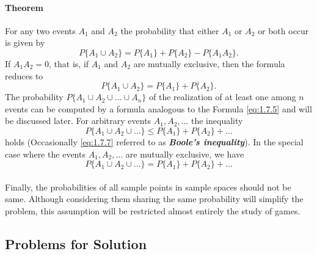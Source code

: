 \documentclass{article}
\numberwithin{equation}{subsection}
\begin{document}
			\paragraph{Theorem} For any two events $A_1$ and $A_2$ the probability that either $A_1$ or $A_2$ or both occur is given by 
			\begin{equation}
				\label{eq:1.7.5}
				P\{A_1\cup A_2\} = P\{A_1\}+P\{A_2\}-P\{A_1A_2\}. 
			\end{equation}
			If $A_1A_2 = 0$, that is, if $A_1$ and $A_2$ are mutually exclusive, then the formula reduces to 			
			\begin{equation}
				\label{eq:1.7.6}
				P\{A_1\cup A_2\} = P\{A_1\}+P\{A_2\}.
			\end{equation}			
			The probability $P\{A_1\cup A_2\cup \dots \cup A_n\}$ of the realization of at least one among $n$ events can be computed by a formula analogous to the Formula \eqref{eq:1.7.5} and will be discussed later. For arbitrary events $A_1,A_2,\dots$ the inequality
			\begin{equation}
				\label{eq:1.7.7}
				P\{A_1\cup A_2\cup \dots\} \leq P\{A_1\} + P\{A_2\} + \dots
			\end{equation}
			holds (Occasionally \eqref{eq:1.7.7} referred to as \textit{\textbf{Boole's inequality}}). In the special case where the events $A_1,A_2,\dots$ are mutually exclusive, we have 
			\begin{equation}
				\label{eq:1.7.8}
				P\{A_1\cup A_2\cup \dots\} = P\{A_1\} + P\{A_2\} + \dots
			\end{equation}
			\paragraph{} Finally, the probabilities of all sample points in sample spaces should not be same. Although considering them sharing the same probability will simplify the problem, this assumption will be restricted almost entirely the study of games.
		\subsection{Problems for Solution}
\end{document}

